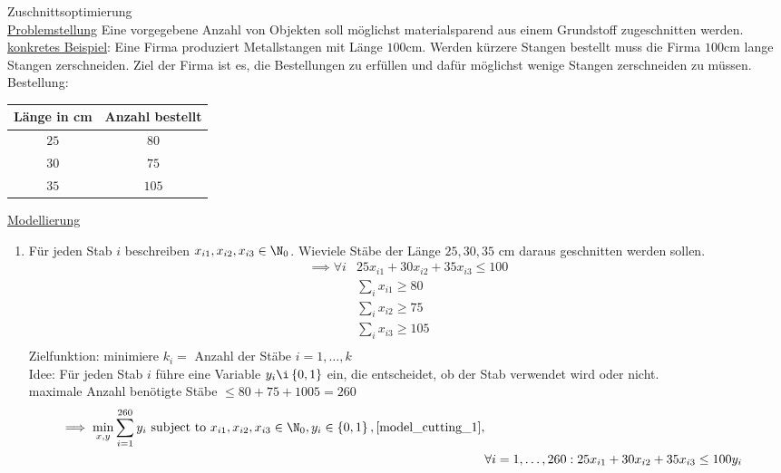 \begin{beispiel}
	Zuschnittsoptimierung\\
  	\underline{Problemstellung} Eine vorgegebene Anzahl von Objekten soll möglichst materialsparend aus einem Grundstoff zugeschnitten werden.\\
  	\underline{konkretes Beispiel}: Eine Firma produziert Metallstangen mit Länge $100$cm. Werden kürzere Stangen bestellt muss die Firma $100$cm lange Stangen zerschneiden. Ziel der Firma ist es, die Bestellungen zu erfüllen und dafür möglichst wenige Stangen zerschneiden zu müssen.\\
  	Bestellung:
  	\begin{tabular}{c|c}
		Länge in cm & Anzahl bestellt}\\
      	\hline
      	$25$ & $80$ \\
      	$30$ & $75$ \\
      	$35$ & $105$ \\
	\end{tabular}
	\underline{Modellierung} 
	\begin{enumerate}
		\item Für jeden Stab $i$ beschreiben $x_{i1},x_{i2},x_{i3} \in \N_{0}$. Wieviele Stäbe der Länge $25,30,35$ cm daraus geschnitten werden sollen.
			\begin{align*}\label{model_cutting_1}
				\implies \forall i & 25x_{i1} + 30x_{i2} + 35x_{i3}\leq 100\\
								   & \sum_{i}^{} x_{i1} \geq 80\\
								   & \sum_{i}^{} x_{i2} \geq 75\\
								   & \sum_{i}^{} x_{i3} \geq 105\\
			\end{align*}
			Zielfunktion: minimiere $k_{i}=$ Anzahl der Stäbe $i = 1,\dots ,k$\\
			Idee: Für jeden Stab $i$ führe eine Variable $y_{i} \i \left\{0,1 \right\}$ ein, die entscheidet, ob der Stab verwendet wird oder nicht.\\
			maximale Anzahl benötigte Stäbe $\leq 80 + 75 +1005 = 260$ 
			\begin{align*}
				\implies \min_{x,y}\sum_{i=1}^{260} y_{i} \text{ subject to } x_{i1},x_{i2},x_{i3} \in \N_{0}, y_{i}\in \left\{0,1 \right\} , \eqref{model_cutting_1},\\
				& \forall i = 1,\dots ,260 : 25x_{i1} + 30x_{i2} + 35x_{i3} \leq 100y_{i}
			\end{align*}
			

\end{enumerate}
\end{beispiel}
